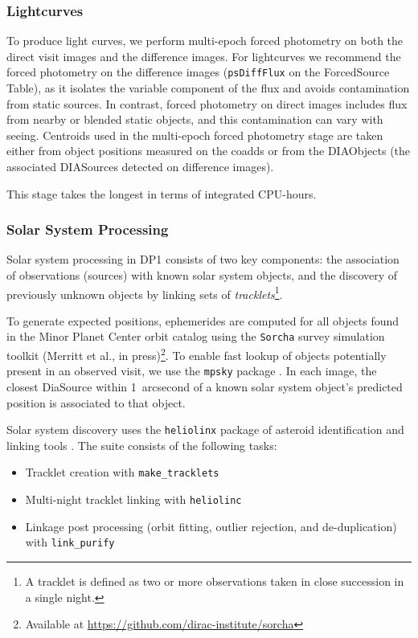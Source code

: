\subsubsection{Lightcurves}
\label{sssec:lightcurves}
To produce light curves, we perform multi-epoch forced photometry on both the direct visit images and the difference images.
For lightcurves we recommend the forced photometry on the difference images (\texttt{psDiffFlux} on the ForcedSource Table), as it isolates the variable component of the flux and avoids contamination from static sources. 
In contrast, forced photometry on direct images includes flux from nearby or blended static objects, and this contamination can vary with seeing.
Centroids used in the multi-epoch forced photometry stage are taken either from object positions measured on the coadds or from the DIAObjects (the associated DIASources detected on difference images).

This stage takes the longest in terms of integrated CPU-hours. 


\subsubsection{Solar System Processing 
\label{sec:drp:solsys}}

Solar system processing in DP1 consists of two key components: the association of observations (sources) with known solar system objects, and the discovery of previously unknown objects by linking sets of {\em tracklets}\footnote{A tracklet is defined as two or more observations taken in close succession in a single night.}.

To generate expected positions, ephemerides are computed for all objects found in the Minor Planet Center orbit catalog using the \texttt{Sorcha} survey simulation toolkit (Merritt et al., in press)\footnote{Available at \url{https://github.com/dirac-institute/sorcha}}. 
To enable fast lookup of objects potentially present in an observed visit, we use the {\tt mpsky} package \citep{mpsky}. 
In each image, the closest DiaSource within 1~arcsecond of a known solar system object's predicted position is associated to that object.

Solar system discovery uses the {\tt heliolinx} package of asteroid identification and linking tools \citep{heliolinx}. 
The suite consists of the following tasks:
\begin{itemize}
    \item Tracklet creation with {\tt make\_tracklets}
    \item Multi-night tracklet linking with {\tt heliolinc}
    \item Linkage post processing (orbit fitting, outlier rejection, and de-duplication) with {\tt link\_purify}
\end{itemize}

